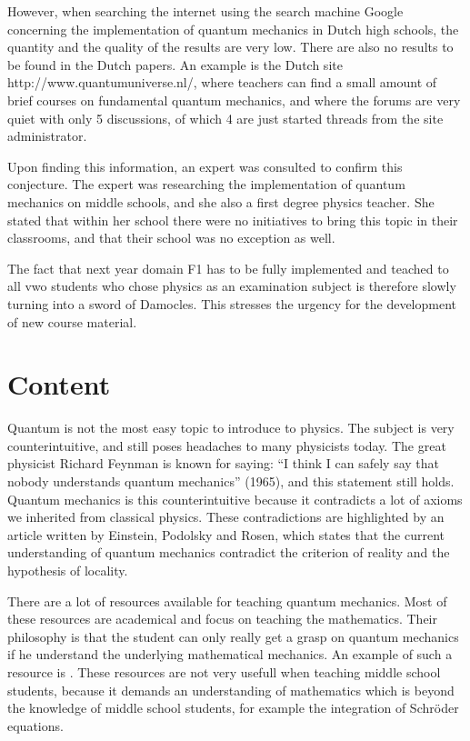 \documentclass[12pt]{report} %
\begin{document}
However, when searching the internet using the search machine Google concerning the implementation of quantum mechanics in Dutch high schools, the quantity and the quality of the results are very low. There are also no results to be found in the Dutch papers. An example is the Dutch site http://www.quantumuniverse.nl/, where teachers can find a small amount of brief courses on fundamental quantum mechanics, and where the forums are very quiet with only 5 discussions, of which 4 are just started threads from the site administrator.

Upon finding this information, an expert was consulted to confirm this conjecture. The expert was researching the implementation of quantum mechanics on middle schools, and she also a first degree physics teacher. She stated that within her school there were no initiatives to bring this topic in their classrooms, and that their school was no exception as well.

The fact that next year domain F1 has to be fully implemented and teached to all vwo students who chose physics as an examination subject is therefore slowly turning into a sword of Damocles. This stresses the urgency for the development of new course material.

\section{Content}

Quantum is not the most easy topic to introduce to physics. The subject is very counterintuitive, and still poses headaches to many physicists today. The great physicist Richard Feynman is known for saying: “I think I can safely say that nobody understands quantum mechanics” (1965), and this statement still holds. Quantum mechanics is this counterintuitive because it contradicts a lot of axioms we inherited from classical physics. These contradictions are highlighted by an article written by Einstein, Podolsky and Rosen, which states that the current understanding of quantum mechanics contradict the criterion of reality and the hypothesis of locality.

There are a lot of resources available for teaching quantum mechanics. Most of these resources are academical and focus on teaching the mathematics. Their philosophy is that the student can only really get a grasp on quantum mechanics if he understand the underlying mathematical mechanics. An example of such a resource is . These resources are not very usefull when teaching middle school students, because it demands an understanding of mathematics which is beyond the knowledge of middle school students, for example the integration of Schröder equations.
\end{document}
